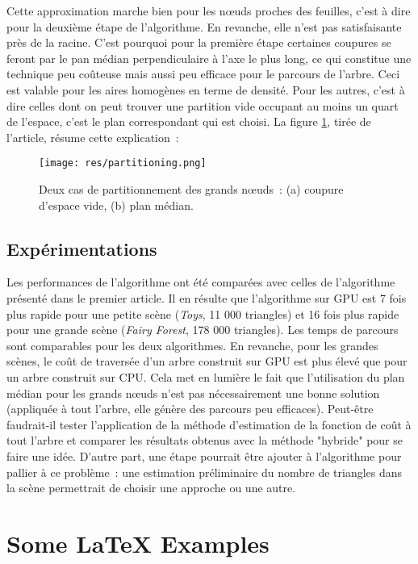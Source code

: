 \documentclass[a4paper]{article}
\begin{document}
Cette approximation marche bien pour les nœuds proches des feuilles, c'est à dire pour la deuxième étape de l'algorithme. En revanche, elle n'est pas satisfaisante près de la racine. C'est pourquoi pour la première étape certaines coupures se feront par le pan médian perpendiculaire à l'axe le plus long, ce qui constitue une technique peu coûteuse mais aussi peu efficace pour le parcours de l'arbre. Ceci est valable pour les aires homogènes en terme de densité. Pour les autres, c'est à dire celles dont on peut trouver une partition vide occupant au moins un quart de l'espace, c'est le plan correspondant qui est choisi. La figure \ref{fig:partition}, tirée de l'article, résume cette explication~:

\begin{figure}[!h]
\centering
\texttt{[image: res/partitioning.png]}
\caption{\label{fig:partition}Deux cas de partitionnement des grands nœuds~: (a) coupure d'espace vide, (b) plan médian.}
\end{figure}


\subsection{Expérimentations}
Les performances de l'algorithme ont été comparées avec celles de l'algorithme présenté dans le premier article. Il en résulte que l'algorithme sur GPU est 7 fois plus rapide pour une petite scène (\textit{Toys}, 11 000 triangles) et 16 fois plus rapide pour une grande scène (\textit{Fairy Forest}, 178 000 triangles). Les temps de parcours sont comparables pour les deux algorithmes. En revanche, pour les grandes scènes, le coût de traversée d'un arbre construit sur GPU est plus élevé que pour un arbre construit sur CPU. Cela met en lumière le fait que l'utilisation du plan médian pour les grands nœuds n'est pas nécessairement une bonne solution (appliquée à tout l'arbre, elle génère des parcours peu efficaces). Peut-être faudrait-il tester l'application de la méthode d'estimation de la fonction de coût à tout l'arbre et comparer les résultats obtenus avec la méthode "hybride" pour se faire une idée. D'autre part, une étape pourrait être ajouter à l'algorithme pour pallier à ce problème~: une estimation préliminaire du nombre de triangles dans la scène permettrait de choisir une approche ou une autre.


\section{Some \LaTeX{} Examples}
\label{sec:examples}
\end{document}
